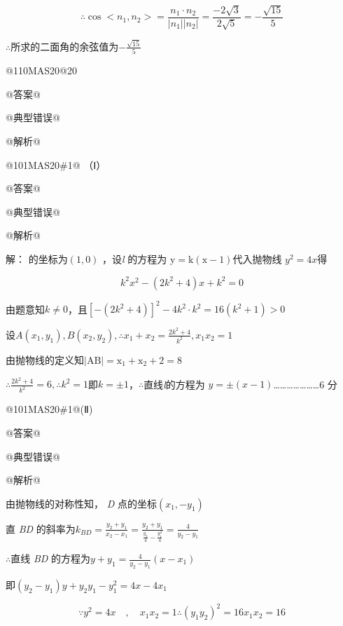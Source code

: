 \documentclass{scrbook}
\begin{document}
\begin{equation*}
\therefore \cos <n_{1},n_{2}>=\frac{n_{1}\cdot n_{2}}{\left|n_{1}\right|\left|n_{2}\right|}=\frac{- 2\sqrt{3}}{2\sqrt{5}}=- \frac{\sqrt{15}}{5}
\end{equation*}

${\therefore}$所求的二面角的余弦值为$- \frac{\sqrt{15}}{5}$

@110MA{\textbar}S20@20

@答案@

@典型错误@

@解析@

@101MA{\textbar}S20\#1@ （Ⅰ）

@答案@

@典型错误@

@解析@

解： \textit{\raisebox{0.5pt}{F}} 的坐标为$(1,0)$ ，设\textit{l} 的方程为 $\mathrm{y}=\mathrm{k}(\mathrm{x}-1)$代入抛物线 $y^{2}=4x$得

\begin{equation*}
k^{2}x^{2}- \left(2k^{2}+4\right)x+k^{2}=0
\end{equation*}

由题意知$k\neq 0$，且$\left[- \left(2k^{2}+4\right)\right]^{2}- 4k^{2}\cdot k^{2}=16\left(k^{2}+1\right)>0$

设$A\left(x_{1},y_{1}\right),B\left(x_{2},y_{2}\right),\therefore x_{1}+x_{2}=\frac{2k^{2}+4}{k^{2}},x_{1}x_{2}=1$

由抛物线的定义知$|\mathrm{AB}|=\mathrm{x}_{1}+\mathrm{x}_{2}+2=8$

$\therefore \frac{2k^{2}+4}{k^{2}}=6,\therefore k^{2}=1$即$k=\pm 1$，${\therefore}$直线\textit{l}的方程为 $y=\pm (x- 1)${\ldots}{\ldots}{\ldots}{\ldots}{\ldots}{\ldots}{\ldots}6 分

@101MA{\textbar}S20\#1@(Ⅱ)

@答案@

@典型错误@

@解析@

由抛物线的对称性知， \textit{D} 点的坐标$\left(x_{1},- y_{1}\right)$

直 \textit{BD} 的斜率为$k_{BD}=\frac{y_{2}+y_{1}}{x_{2}- x_{1}}=\frac{y_{2}+y_{1}}{\frac{y_{2}}{4}- \frac{y_{1}^{2}}{4}}=\frac{4}{y_{2}- y_{1}}$

${\therefore}$直线 \textit{BD} 的方程为$y+y_{1}=\frac{4}{y_{2}- y_{1}}\left(x- x_{1}\right)$

即$\left(y_{2}- y_{1}\right)y+y_{2}y_{1}- y_{1}^{2}=4x- 4x_{1}$

\begin{equation*}
\because y^{2}=4x{\quad} ,{\quad} x_{1}x_{2}=1\therefore \left(y_{1}y_{2}\right)^{2}=16x_{1}x_{2}=16
\end{equation*}
\end{document}
